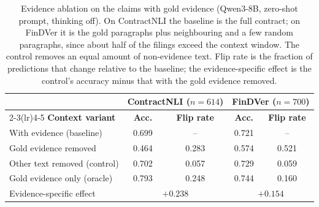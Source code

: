 \documentclass[11pt]{article}
\begin{document}
\begin{table}[H]
\centering
\footnotesize
\setlength{\tabcolsep}{6pt}
\begin{tabular}{lcccc}
\toprule
& \multicolumn{2}{c}{\textbf{ContractNLI} ($n=614$)} & \multicolumn{2}{c}{\textbf{FinDVer} ($n=700$)} \\
\cmidrule(lr){2-3}\cmidrule(lr){4-5}
\textbf{Context variant} & \textbf{Acc.} & \textbf{Flip rate} & \textbf{Acc.} & \textbf{Flip rate} \\
\midrule
With evidence (baseline)        & 0.699 & --    & 0.721 & --    \\
Gold evidence removed           & 0.464 & 0.283 & 0.574 & 0.521 \\
Other text removed (control)    & 0.702 & 0.057 & 0.729 & 0.059 \\
Gold evidence only (oracle)     & 0.793 & 0.248 & 0.744 & 0.160 \\
\midrule
Evidence-specific effect        & \multicolumn{2}{c}{$+0.238$} & \multicolumn{2}{c}{$+0.154$} \\
\bottomrule
\end{tabular}
\caption{Evidence ablation on the claims with gold evidence (Qwen3-8B,
zero-shot prompt, thinking off). On ContractNLI the baseline is the full
contract; on FinDVer it is the gold paragraphs plus neighbouring and a few
random paragraphs, since about half of the filings exceed the context
window. The control removes an equal amount of non-evidence text. Flip
rate is the fraction of predictions that change relative to the baseline;
the evidence-specific effect is the control's accuracy minus that with the
gold evidence removed.}
\label{tab:faith_ablation}
\end{table}
\end{document}
